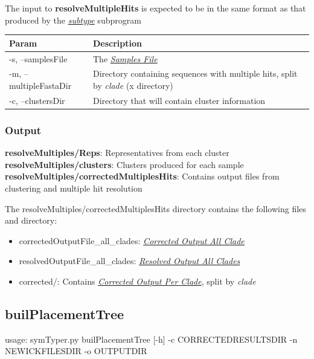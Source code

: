 \documentclass[letterpaper,10pt,english]{sphinxmanual}
\begin{document}
The input to \textbf{resolveMultipleHits} is expected to be in the same format as that produced by the {\hyperref[CommandLine:subtype]{\emph{subtype}}} subprogram

\begin{tabulary}{\linewidth}{|L|L|}
\hline
\textsf{\relax 
Param
} & \textsf{\relax 
Description
}\\
\hline
-s, --samplesFile
 & 
The {\hyperref[defs:samplefile]{\emph{Samples File}}}
\\

-m, --multipleFastaDir
 & 
Directory containing sequences with multiple hits, split by \emph{clade} (x directory)
\\

-c, --clustersDir
 & 
Directory that will contain cluster information
\\
\hline\end{tabulary}



\subsubsection{Output}
\label{CommandLine:id6}
\textbf{resolveMultiples/Reps}: Representatives from each cluster
\textbf{resolveMultiples/clusters}: Clusters produced for each sample
\textbf{resolveMultiples/correctedMultiplesHits}: Contains output files from clustering and multiple hit resolution

The resolveMultiples/correctedMultiplesHits directory contains the following files and directory:
\begin{itemize}
\item {} 
correctedOutputFile\_all\_clades: {\hyperref[defs:correctedall]{\emph{Corrected Output All Clade}}}

\item {} 
resolvedOutputFile\_all\_clades: {\hyperref[defs:resolvedall]{\emph{Resolved Output All Clades}}}

\item {} 
corrected/: Contains {\hyperref[defs:correctedperclade]{\emph{Corrected Output Per Clade}}}, split by \emph{clade}

\end{itemize}


\subsection{builPlacementTree}
\label{CommandLine:id7}\label{CommandLine:builplacementtree}
usage: symTyper.py builPlacementTree {[}-h{]} -c CORRECTEDRESULTSDIR -n NEWICKFILESDIR -o OUTPUTDIR
\end{document}
